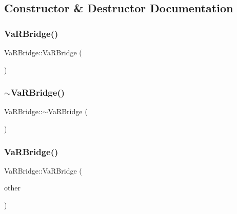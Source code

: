 \subsection{Constructor \& Destructor Documentation}
\hypertarget{classVaRBridge_ae2a2b2437f30f28b3722a4634cc80161}{}\label{classVaRBridge_ae2a2b2437f30f28b3722a4634cc80161} 
\subsubsection{\texorpdfstring{Va\+R\+Bridge()}{VaRBridge()}\hspace{0.1cm}{\footnotesize\ttfamily [1/2]}}
{\footnotesize\ttfamily Va\+R\+Bridge\+::\+Va\+R\+Bridge (\begin{DoxyParamCaption}{ }\end{DoxyParamCaption})}

\hypertarget{classVaRBridge_a876183182e5eb13a652627c69613963a}{}\label{classVaRBridge_a876183182e5eb13a652627c69613963a} 
\subsubsection{\texorpdfstring{$\sim$\+Va\+R\+Bridge()}{~VaRBridge()}}
{\footnotesize\ttfamily Va\+R\+Bridge\+::$\sim$\+Va\+R\+Bridge (\begin{DoxyParamCaption}{ }\end{DoxyParamCaption})\hspace{0.3cm}{\ttfamily [inline]}}

\hypertarget{classVaRBridge_a2f83dff0248e044a116b4b063ca78b83}{}\label{classVaRBridge_a2f83dff0248e044a116b4b063ca78b83} 
\subsubsection{\texorpdfstring{Va\+R\+Bridge()}{VaRBridge()}\hspace{0.1cm}{\footnotesize\ttfamily [2/2]}}
{\footnotesize\ttfamily Va\+R\+Bridge\+::\+Va\+R\+Bridge (\begin{DoxyParamCaption}\item[{const \hyperlink{classVaRBridge}{Va\+R\+Bridge} \&}]{other }\end{DoxyParamCaption})\hspace{0.3cm}{\ttfamily [default]}}



